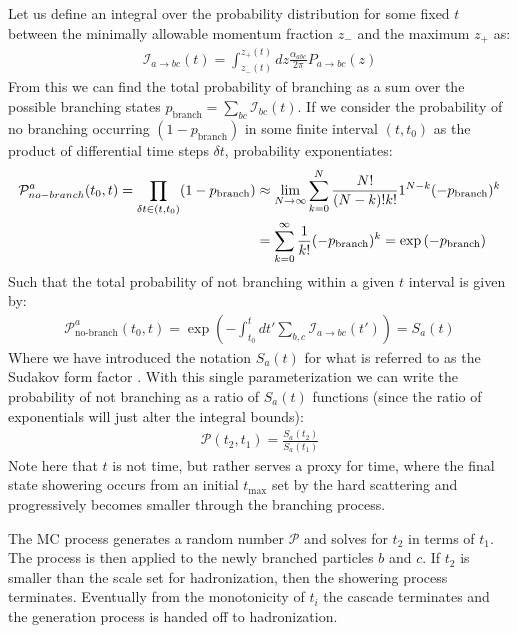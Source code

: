 Let us define an integral over the probability distribution for some fixed $t$ between the
minimally allowable momentum fraction $z_{-}$ and the maximum $z_{+}$ as:
\begin{align*}
\mathcal{I}_{a \rightarrow bc} (t) = \int_{z_{-}(t)}^{z_{+}(t)} dz \frac{\alpha_{abc}}{2\pi} P_{a\rightarrow bc} (z) 
\end{align*}
From this we can find the total probability of branching as a sum over the
possible branching states $p_{\textrm{branch}} = \sum_{bc} \mathcal{I}_{bc}(t)$. If we consider the probability of no branching occurring $(1-p_{\textrm{branch}})$ in some finite
interval $(t,t_0)$ as the product of differential time steps $\delta t$, probability exponentiates:
\begin{align*}
\mathcal{P}_{no-branch}^a(t_0,t) = \prod_{\delta t \in (t,t_0)} (1-p_{\text{\textrm{branch}}}) &\approx \lim_{N\rightarrow \infty} 
\sum_{k=0}^{N} \frac{N!}{(N-k)!k!} 1^{N-k}(-p_{\text{\textrm{branch}}})^k  \\
&= \sum_{k=0}^{\infty} \frac{1}{k!} (-p_{\textrm{branch}})^k = \exp{(-p_{\textrm{branch}})}
\end{align*}
Such that the total probability of not branching within a given $t$ interval is given by:
\begin{align*}
\mathcal{P}_{\textrm{no-branch}}^a(t_0,t) = 
\exp { \left ( - \int_{t_0}^{t} dt' \sum_{b,c} \mathcal{I}_{a\rightarrow bc} (t')   \right )} = S_{a}(t)
\end{align*}
Where we have introduced the notation $S_a(t)$ for what is referred to as the Sudakov form 
factor \cite{sudakov}. With this single parameterization we can write the probability of not branching as a ratio of $S_a(t)$ functions (since the ratio of exponentials will just alter the integral bounds):
\begin{align*}
\mathcal{P}(t_2, t_1) = \frac{S_a(t_{2})}{S_a(t_1)}
\end{align*}
Note here that $t$ is not time, but rather serves a proxy for time, where the
final state showering occurs from an initial $t_{\textrm{max}}$ set by the hard scattering and progressively becomes smaller through the branching process.   

The MC process generates a random number $\mathcal{P}$ and solves for $t_2$ in terms
of $t_1$. The process is then applied to the newly branched particles $b$ and $c$. If $t_2$ is smaller than the scale
 set for hadronization, then the showering process terminates. Eventually from the monotonicity of $t_i$ the cascade
terminates and the generation process is handed off to hadronization.

